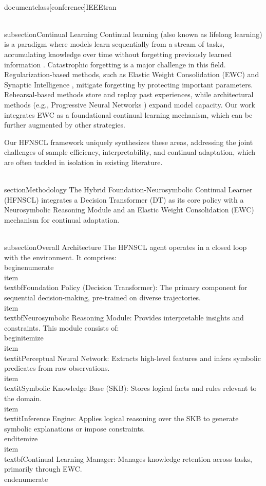 \\documentclass[conference]{IEEEtran}
\begin{document}
\\subsection{Continual Learning}
Continual learning (also known as lifelong learning) is a paradigm where models learn sequentially from a stream of tasks, accumulating knowledge over time without forgetting previously learned information \cite{parisi2019continual}. Catastrophic forgetting is a major challenge in this field. Regularization-based methods, such as Elastic Weight Consolidation (EWC) \cite{kirkpatrick2017overcoming} and Synaptic Intelligence \cite{zenke2017continual}, mitigate forgetting by protecting important parameters. Rehearsal-based methods store and replay past experiences, while architectural methods (e.g., Progressive Neural Networks \cite{rusu2016progressive}) expand model capacity. Our work integrates EWC as a foundational continual learning mechanism, which can be further augmented by other strategies.

Our HFNSCL framework uniquely synthesizes these areas, addressing the joint challenges of sample efficiency, interpretability, and continual adaptation, which are often tackled in isolation in existing literature.

\\section{Methodology}
The Hybrid Foundation-Neurosymbolic Continual Learner (HFNSCL) integrates a Decision Transformer (DT) as its core policy with a Neurosymbolic Reasoning Module and an Elastic Weight Consolidation (EWC) mechanism for continual adaptation.

\\subsection{Overall Architecture}
The HFNSCL agent operates in a closed loop with the environment. It comprises:
\\begin{enumerate}
    \\item \\textbf{Foundation Policy (Decision Transformer)}: The primary component for sequential decision-making, pre-trained on diverse trajectories.
    \\item \\textbf{Neurosymbolic Reasoning Module}: Provides interpretable insights and constraints. This module consists of:
    \\begin{itemize}
        \\item \\textit{Perceptual Neural Network}: Extracts high-level features and infers symbolic predicates from raw observations.
        \\item \\textit{Symbolic Knowledge Base (SKB)}: Stores logical facts and rules relevant to the domain.
        \\item \\textit{Inference Engine}: Applies logical reasoning over the SKB to generate symbolic explanations or impose constraints.
    \\end{itemize}
    \\item \\textbf{Continual Learning Manager}: Manages knowledge retention across tasks, primarily through EWC.
\\end{enumerate}
\end{document}
